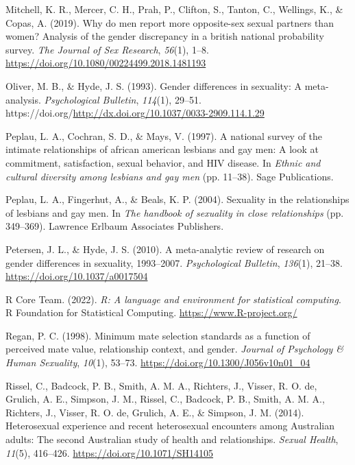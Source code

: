 \documentclass[
  12pt,
]{article}
\newlength{\cslhangindent}
\newlength{\cslentryspacingunit} %
\newenvironment{CSLReferences}[2] %
 {%
  \setlength{\parindent}{0pt}
  \ifodd #1
  \let\oldpar\par
  \def\par{\hangindent=\cslhangindent\oldpar}
  \fi
  \setlength{\parskip}{#2\cslentryspacingunit}
 }%
 {}
\begin{document}
\begin{CSLReferences}{1}{0}
\leavevmode{}%
Mitchell, K. R., Mercer, C. H., Prah, P., Clifton, S., Tanton, C.,
Wellings, K., \& Copas, A. (2019). Why do men report more opposite-sex
sexual partners than women? Analysis of the gender discrepancy in a
british national probability survey. \emph{The Journal of Sex Research},
\emph{56}(1), 1--8. \url{https://doi.org/10.1080/00224499.2018.1481193}

\leavevmode{}%
Oliver, M. B., \& Hyde, J. S. (1993). Gender differences in sexuality: A
meta-analysis. \emph{Psychological Bulletin}, \emph{114}(1), 29--51.
https://doi.org/\url{http://dx.doi.org/10.1037/0033-2909.114.1.29}

\leavevmode{}%
Peplau, L. A., Cochran, S. D., \& Mays, V. (1997). A national survey of
the intimate relationships of african american lesbians and gay men: A
look at commitment, satisfaction, sexual behavior, and {HIV} disease. In
\emph{Ethnic and cultural diversity among lesbians and gay men} (pp.
11--38). Sage Publications.

\leavevmode{}%
Peplau, L. A., Fingerhut, A., \& Beals, K. P. (2004). Sexuality in the
relationships of lesbians and gay men. In \emph{The handbook of
sexuality in close relationships} (pp. 349--369). Lawrence Erlbaum
Associates Publishers.

\leavevmode{}%
Petersen, J. L., \& Hyde, J. S. (2010). A meta-analytic review of
research on gender differences in sexuality, 1993--2007.
\emph{Psychological Bulletin}, \emph{136}(1), 21--38.
\url{https://doi.org/10.1037/a0017504}

\leavevmode{}%
R Core Team. (2022). \emph{R: A language and environment for statistical
computing}. R Foundation for Statistical Computing.
\url{https://www.R-project.org/}

\leavevmode{}%
Regan, P. C. (1998). Minimum mate selection standards as a function of
perceived mate value, relationship context, and gender. \emph{Journal of
Psychology \& Human Sexuality}, \emph{10}(1), 53--73.
\url{https://doi.org/10.1300/J056v10n01_04}

\leavevmode{}%
Rissel, C., Badcock, P. B., Smith, A. M. A., Richters, J., Visser, R. O.
de, Grulich, A. E., Simpson, J. M., Rissel, C., Badcock, P. B., Smith,
A. M. A., Richters, J., Visser, R. O. de, Grulich, A. E., \& Simpson, J.
M. (2014). Heterosexual experience and recent heterosexual encounters
among {A}ustralian adults: The second {A}ustralian study of health and
relationships. \emph{Sexual Health}, \emph{11}(5), 416--426.
\url{https://doi.org/10.1071/SH14105}


\end{CSLReferences}
\end{document}
